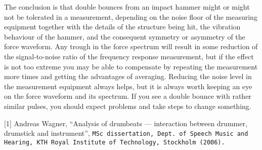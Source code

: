   The conclusion is that double bounces from an impact hammer might or might 
  not be tolerated in a measurement, depending on the noise floor of the 
  measuring equipment together with the details of the structure being hit, the 
  vibration behaviour of the hammer, and the consequent symmetry or asymmetry 
  of the force waveform. Any trough in the force spectrum will result in some 
  reduction of the signal-to-noise ratio of the frequency response measurement, 
  but if the effect is not too extreme you may be able to compensate by 
  repeating the measurement more times and getting the advantages of averaging. 
  Reducing the noise level in the measurement equipment always helps, but it is 
  always worth keeping an eye on the force waveform and its spectrum. If you 
  see a double bounce with rather similar pulses, you should expect problems 
  and take steps to change something. 

  \sectionreferences{}[1] Andreas Wagner, “Analysis of drumbeats — interaction 
  between drummer, drumstick and instrument”, \tt{}MSc dissertation\rm{}, Dept. 
  of Speech Music and Hearing, KTH Royal Institute of Technology, Stockholm 
  (2006). 